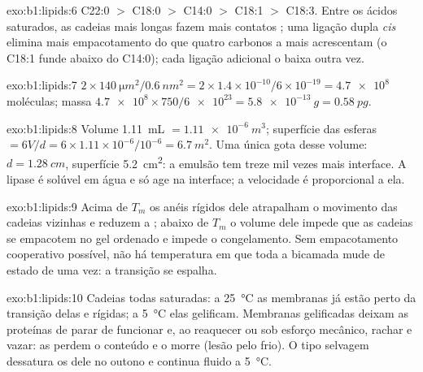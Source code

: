 \begin{solution}{exo:b1:lipids:6}
C22:0 $>$ C18:0 $>$ C14:0 $>$ C18:1 $>$ C18:3. Entre os ácidos
saturados, as cadeias mais longas fazem mais contatos ;
uma ligação dupla \emph{cis} elimina mais empacotamento do que quatro
carbonos a mais acrescentam (o C18:1 funde abaixo do C14:0); cada
ligação adicional o baixa outra vez.
\end{solution}

\begin{solution}{exo:b1:lipids:7}
$2\times\qty{140}{\micro m^2}/\qty{0.6}{nm^2} = 2\times 1.4\times
10^{-10}/6\times 10^{-19} = \num{4.7e8}$ moléculas; massa
$\num{4.7e8}\times 750/\num{6e23} = \qty{5.8e-13}{g} = \qty{0.58}{pg}$.
\end{solution}

\begin{solution}{exo:b1:lipids:8}
Volume \qty{1.11}{mL} $= \qty{1.11e-6}{m^3}$; superfície das esferas
$= 6V/d = 6\times 1.11\times 10^{-6}/10^{-6} = \qty{6.7}{m^2}$. Uma
única gota desse volume: $d = \qty{1.28}{cm}$, superfície
\qty{5.2}{cm^2}: a emulsão tem treze mil vezes mais interface. A lipase
é solúvel em água e só age na interface; a velocidade é proporcional a
ela.
\end{solution}

\begin{solution}{exo:b1:lipids:9}
Acima de $T_m$ os anéis rígidos dele atrapalham o movimento das cadeias
vizinhas e reduzem a ; abaixo de $T_m$ o volume dele impede que
as cadeias se empacotem no gel ordenado e impede o congelamento. Sem
empacotamento cooperativo possível, não há temperatura em que toda a
bicamada mude de estado de uma vez: a transição se espalha.
\end{solution}

\begin{solution}{exo:b1:lipids:10}
Cadeias todas saturadas: a \qty{25}{\celsius} as membranas já estão
perto da transição delas e rígidas; a \qty{5}{\celsius} elas
gelificam. Membranas gelificadas deixam as proteínas de parar de
funcionar e, ao reaquecer ou sob esforço mecânico, rachar e vazar: as
 perdem o conteúdo e o  morre (lesão pelo frio). O tipo
selvagem dessatura os  dele no outono e continua fluido a
\qty{5}{\celsius}.
\end{solution}

